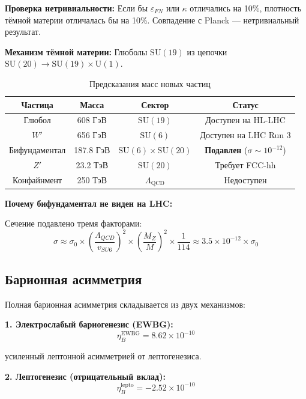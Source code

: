 \documentclass[12pt,a4paper,twoside]{article}
\newcommand{\SU}{\mathrm{SU}}
\newcommand{\Uone}{\mathrm{U}(1)}
\newcommand{\EPS}{\varepsilon}
\theoremstyle{definition}
\begin{document}
\textbf{Проверка нетривиальности:} Если бы $\EPS_{FN}$ или $\kappa$ отличались на 10\%, плотность тёмной материи отличалась бы на 10\%. Совпадение с Planck — нетривиальный результат.

\textbf{Механизм тёмной материи:} Глюболы $\SU(19)$ из цепочки $\SU(20) \to \SU(19) \times \Uone$.

\begin{table}[H]
\centering
\small
\caption{Предсказания масс новых частиц}
\label{tab:new_particles}
\begin{tabular}{c|c|c|c}
\toprule
\textbf{Частица} & \textbf{Масса} & \textbf{Сектор} & \textbf{Статус} \\
\midrule
Глюбол & 608 ГэВ & $\SU(19)$ & Доступен на HL-LHC \\
$W'$ & 656 ГэВ & $\SU(6)$ & Доступен на LHC Run 3 \\
Бифундаментал & 187.8 ГэВ & $\SU(6)\times\SU(20)$ & \textbf{Подавлен} ($\sigma \sim 10^{-12}$) \\
$Z'$ & 23.2 ТэВ & $\SU(20)$ & Требует FCC-hh \\
Конфайнмент & 250 ТэВ & $\Lambda_{\text{QCD}}$ & Недоступен \\
\bottomrule
\end{tabular}
\end{table}

\textbf{Почему бифундаментал не виден на LHC:}

Сечение подавлено тремя факторами:
\begin{equation}
\sigma \approx \sigma_0 \times \left(\frac{\Lambda_{QCD}}{v_{SU6}}\right)^2 \times \left(\frac{M_Z}{M}\right)^2 \times \frac{1}{114} \approx 3.5 \times 10^{-12} \times \sigma_0
\end{equation}

\subsection{Барионная асимметрия}

Полная барионная асимметрия складывается из двух механизмов:

\textbf{1. Электрослабый бариогенезис (EWBG):}
\begin{equation}
\eta_B^{\text{EWBG}} = 8.62 \times 10^{-10}
\end{equation}

усиленный лептонной асимметрией от лептогенезиса.

\textbf{2. Лептогенезис (отрицательный вклад):}
\begin{equation}
\eta_B^{\text{lepto}} = -2.52 \times 10^{-10}
\end{equation}
\end{document}
